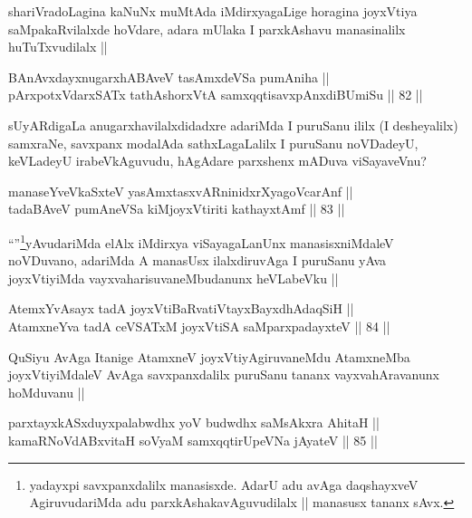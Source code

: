 \begin{artha}
shariVradoLagina kaNuNx muMtAda iMdirxyagaLige horagina  joyxVtiya saMpakaRvilalxde hoVdare, adara mUlaka I parxkAshavu manasinalilx huTuTxvudilalx ||
\end{artha}

\begin{shl}
BAnAvxdayxnugarxhABAveV tasAmxdeVSa pumAniha || \\
pArxpotxV\s darxSATx tathA\s shorxVtA samxqqtisavxpAnxdiBUmiSu ||  82 ||  
\end{shl}

\begin{artha}
sUyARdigaLa anugarxhavilalxdidadxre adariMda I puruSanu ililx (I desheyalilx) samxraNe, savxpanx modalAda sathxLagaLalilx I puruSanu noVDadeyU, keVLadeyU irabeVkAguvudu, hAgAdare parxshenx mADuva viSayaveVnu?
\end{artha}

\begin{shl}
manaseYveVkaSxteV yasAmxtasxvARninidxrXyagoVcarAnf ||  \\
tadaBAveV pumAneVSa kiMjoyxVtiriti kathayxtAmf ||  83 ||  
\end{shl}

\begin{artha}
``\stext''\footnote{yadayxpi savxpanxdalilx manasisxde. AdarU adu avAga daqshayxveV AgiruvudariMda adu parxkAshakavAguvudilalx || manasusx tananx sAvx.}yAvudariMda elAlx iMdirxya viSayagaLanUnx manasisxniMdaleV noVDuvano, adariMda A manasUsx ilalxdiruvAga I puruSanu yAva joyxVtiyiMda vayxvaharisuvaneMbudanunx heVLabeVku ||
\end{artha}

\begin{shl}
AtemxYvAsayx tadA joyxVtiBaRvatiVtayxBayxdhAdaqSiH || \\
AtamxneYva tadA ceVSATxM joyxVtiSA saMparxpadayxteV ||  84 ||  
\end{shl}

\begin{artha}
QuSiyu AvAga Itanige AtamxneV joyxVtiyAgiruvaneMdu AtamxneMba joyxVtiyiMdaleV AvAga savxpanxdalilx puruSanu tananx vayxvahAravanunx hoMduvanu ||
\end{artha}


\begin{shl}
parxtayxkASxduyxpalabwdhx yoV budwdhx saMsAkxra AhitaH || \\
kamaRNoVdABxvitaH soV\s yaM samxqqtirUpeVNa jAyateV ||  85 ||  
\end{shl}

